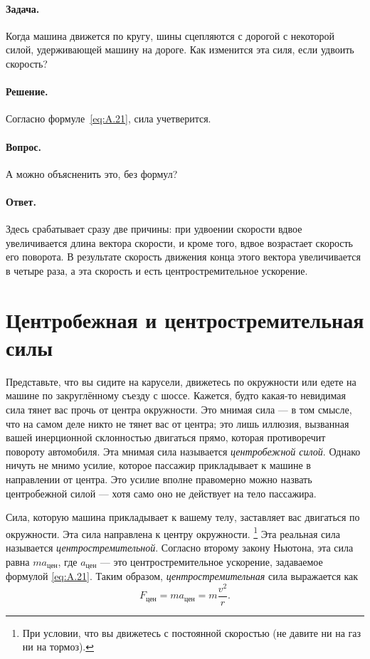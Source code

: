 \paragraph{Задача.}
Когда машина движется по кругу, шины сцепляются с дорогой с некоторой силой, удерживающей машину на дороге.
Как изменится эта силя, если удвоить скорость?

\paragraph{Решение.}
Согласно формуле~\eqref{eq:A.21}, сила учетверится.

\paragraph{Вопрос.}
А можно объясненить это, без формул?

\paragraph{Ответ.}
Здесь срабатывает сразу две причины:
при удвоении скорости вдвое увеличивается длина вектора скорости, и кроме того, вдвое возрастает скорость его поворота.
В результате скорость движения конца этого вектора увеличивается в четыре раза, а эта скорость и есть центростремительное ускорение.

\section{Центробежная и центростремительная силы}\label{Центробежная и центростремительная силы}

Представьте, что вы сидите на карусели, движетесь по окружности или едете на машине по закруглённому съезду с шоссе.
Кажется, будто какая-то невидимая сила тянет вас прочь от центра окружности.
Это мнимая сила --- в том смысле, что на самом деле никто не тянет вас от центра; это лишь иллюзия, вызванная вашей инерционной склонностью двигаться прямо, которая противоречит повороту автомобиля.
Эта мнимая сила называется \emph{центробежной силой}.
Однако ничуть не мнимо усилие, которое пассажир прикладывает к машине в направлении от центра.
Это усилие вполне правомерно можно назвать центробежной силой --- хотя само оно не действует на тело пассажира.

Сила, которую машина прикладывает к вашему телу, заставляет вас двигаться по окружности.
Эта сила направлена к центру окружности.%
\footnote{При условии, что вы движетесь с постоянной скоростью (не давите ни на газ ни на тормоз).}
Эта реальная сила называется \emph{центростремительной}.
Согласно второму закону Ньютона, эта сила равна $ma_{\text{цен}}$, где $a_{\text{цен}}$ --- это центростремительное ускорение, задаваемое формулой \eqref{eq:A.21}.
Таким образом, \emph{центростремительная} сила выражается как
\[F_{\text{цен}}=ma_{\text{цен}}=m\frac{v^2}{r}.\]

